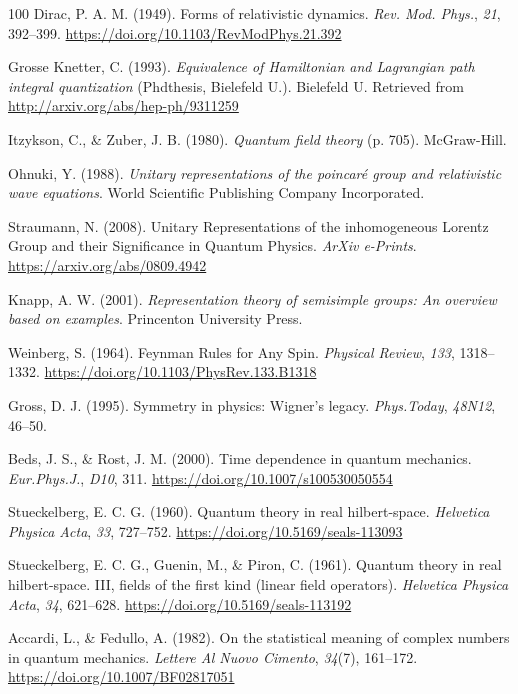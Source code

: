 \documentclass[11pt]{book}
\begin{document}
\begin{thebibliography}{100}
 Dirac, P. A. M. (1949). Forms of relativistic dynamics. \emph{Rev. Mod.
Phys.}, \emph{21}, 392--399.
\url{https://doi.org/10.1103/RevModPhys.21.392}

 Grosse Knetter, C. (1993). \emph{Equivalence of Hamiltonian and
Lagrangian path integral quantization} (Phdthesis, Bielefeld U.).
Bielefeld U. Retrieved from \url{http://arxiv.org/abs/hep-ph/9311259}

 Itzykson, C., \& Zuber, J. B. (1980). \emph{Quantum field theory} (p.
705). McGraw-Hill.

 Ohnuki, Y. (1988). \emph{Unitary representations of the poincaré group
and relativistic wave equations}. World Scientific Publishing Company
Incorporated.

 Straumann, N. (2008). Unitary Representations of the inhomogeneous
Lorentz Group and their Significance in Quantum Physics. \emph{ArXiv
e-Prints}. \url{https://arxiv.org/abs/0809.4942}

 Knapp, A. W. (2001). \emph{Representation theory of semisimple groups:
An overview based on examples}. Princenton University Press.

 Weinberg, S. (1964). Feynman Rules for Any Spin. \emph{Physical Review},
\emph{133}, 1318--1332. \url{https://doi.org/10.1103/PhysRev.133.B1318}

 Gross, D. J. (1995). Symmetry in physics: Wigner's legacy.
\emph{Phys.Today}, \emph{48N12}, 46--50.

 Beds, J. S., \& Rost, J. M. (2000). Time dependence in quantum
mechanics. \emph{Eur.Phys.J.}, \emph{D10}, 311.
\url{https://doi.org/10.1007/s100530050554}

 Stueckelberg, E. C. G. (1960). Quantum theory in real hilbert-space.
\emph{Helvetica Physica Acta}, \emph{33}, 727--752.
\url{https://doi.org/10.5169/seals-113093}

 Stueckelberg, E. C. G., Guenin, M., \& Piron, C. (1961). Quantum theory
in real hilbert-space. III, fields of the first kind (linear field
operators). \emph{Helvetica Physica Acta}, \emph{34}, 621--628.
\url{https://doi.org/10.5169/seals-113192}

 Accardi, L., \& Fedullo, A. (1982). On the statistical meaning of
complex numbers in quantum mechanics. \emph{Lettere Al Nuovo Cimento},
\emph{34}(7), 161--172. \url{https://doi.org/10.1007/BF02817051}


\end{thebibliography}
\end{document}
